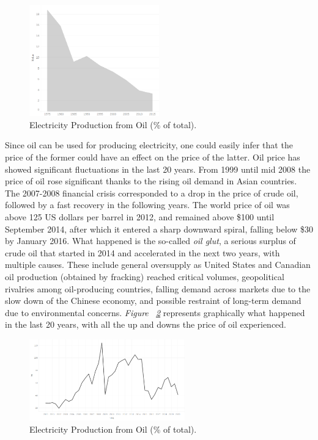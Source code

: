 \documentclass[a4paper,12pt]{book}
\begin{document}
\begin{figure}[tb]
\begin{center}
\captionsetup{justification=centering}
\includegraphics[width=0.5\textwidth]{Images/oil.png}
\caption{Electricity Production from Oil (\% of total).}
\label{fig:oil}	
\end{center}
\end{figure}
 
Since oil can be used for producing electricity, one could easily infer that the price of the former could have an effect on the price of the latter. Oil price has showed significant fluctuations in the last 20 years. From 1999 until mid 2008 the price of oil rose significant thanks to the rising oil demand in Asian countries. The 2007-2008 financial crisis corresponded to a drop in the price of crude oil, followed by a fast recovery in the following years. The world price of oil was above 125 US dollars per barrel in 2012, and remained above \$100 until September 2014, after which it entered a sharp downward spiral, falling below \$30 by January 2016. What happened is the so-called \textit{oil glut}, a serious surplus of crude oil that started in 2014 and accelerated in the next two years, with multiple causes. These include general oversupply as United States and Canadian oil production (obtained by fracking) reached critical volumes, geopolitical rivalries among oil-producing countries, falling demand across markets due to the slow down of the Chinese economy, and possible restraint of long-term demand due to environmental concerns. \textit{Figure ~\ref{fig:oilbeh}} represents graphically what happened in the last 20 years, with all the up and downs the price of oil experienced.

\begin{figure}[tb]
\begin{center}
\captionsetup{justification=centering}
\includegraphics[width=0.6\textwidth]{Images/oilbeh.png}
\caption{Electricity Production from Oil (\% of total). }
\label{fig:oilbeh}
\end{center}
\end{figure}
\end{document}
